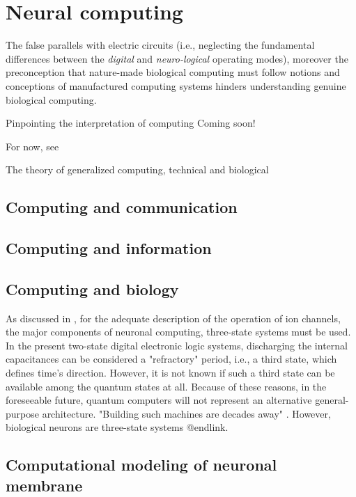 \iflatexml
\else
\minitoc
\fi
\chapter[Computing with neurons]{Neural computing\label{ch:Computing}}
	
	
	

	The false parallels with electric circuits (i.e., neglecting the fundamental differences between the \textit{digital} and \textit{neuro-logical} operating modes),
moreover the preconception that nature-made \hypertarget{BiologicalComputing}{biological computing} must follow notions and conceptions of manufactured computing systems hinders understanding genuine biological computing. 



Pinpointing the interpretation of computing
Coming soon!

For now, see \cite{VeghRevisingClassicComputing:2021, VeghScalingANN:2021,VeghHowMany:2020}

The theory of \hypertarget{GeneralizedComputing}{generalized computing}, technical and biological


\section{\label{COMPUTING_COMMUNICATION} Computing and communication}

\section{\label{COMPUTING_INFORMATION} Computing and information}

\section{\label{COMPUTING_BIOLOGY} Computing and biology}
As discussed in \cite{ThreeStateUnidirectional:2004,
MarkovianIonChannel:2005}, for the adequate description of the operation
of ion channels, the major components of neuronal computing, three-state systems must be used.
In the present two-state digital electronic logic systems, discharging the internal capacitances can be considered a "refractory" period, i.e., a third state, which defines time's direction. However, it is not known if such a third state can be available among the quantum states at all.
Because of these reasons,  in the foreseeable future, quantum computers will not
represent an alternative general-purpose architecture.
 "Building such machines are decades away" \cite{ScienceQuantumComputers:2018}.
 However, %
 biological neurons are three-state systems @endlink.


\section{ Computational modeling of neuronal membrane\label{MODELING_NEURONAL_MEMBRANE_COMPUTATIONAL}}




	
	
